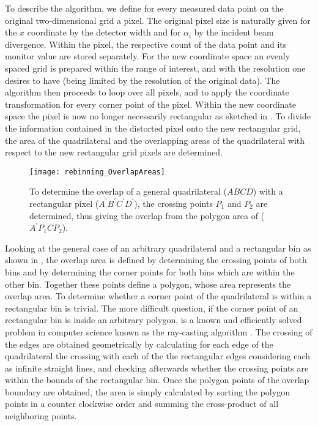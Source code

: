\documentclass[\main/dresen_thesis.tex]{subfiles}
\begin{document}
  To describe the algorithm, we define for every measured data point on the original two-dimensional grid a pixel.
  The original pixel size is naturally given for the $x$ coordinate by the detector width and for $\alpha_i$ by the incident beam divergence.
  Within the pixel, the respective count of the data point and its monitor value are stored separately.
  For the new coordinate space an evenly spaced grid is prepared within the range of interest, and with the resolution one desires to have (being limited by the resolution of the original data).
  The algorithm then proceeds to loop over all pixels, and to apply the coordinate transformation for every corner point of the pixel.
  Within the new coordinate space the pixel is now no longer necessarily rectangular as sketched in .
  To divide the information contained in the distorted pixel onto the new rectangular grid, the area of the quadrilateral and the overlapping areas of the quadrilateral with respect to the new rectangular grid pixels are determined.

  \begin{figure}[tb]
    \centering
    \texttt{[image: rebinning\_OverlapAreas]}
    \caption{\label{fig:numericalMethods:rebinningPixelSplitting:overlapAreas}To determine the overlap of a general quadrilateral ($ABCD$) with a rectangular pixel ($A^\prime B^\prime C^\prime D^\prime $), the crossing points $P_1$ and $P_2$ are determined, thus giving the overlap from the polygon area of ($A^\prime P_1CP_2$).}
  \end{figure}

  Looking at the general case of an arbitrary quadrilateral and a rectangular bin as shown in , the overlap area is defined by determining the crossing points of both bins and by determining the corner points for both bins which are within the other bin.
  Together these points define a polygon, whose area represents the overlap area.
  To determine whether a corner point of the quadrilateral is within a rectangular bin is trivial.
  The more difficult question, if the corner point of an rectangular bin is inside an arbitrary polygon, is a known and efficiently solved problem in computer science known as the ray-casting algorithm \cite{Shimrat_1962_Algor}.
  The crossing of the edges are obtained geometrically by calculating for each edge of the quadrilateral the crossing with each of the the rectangular edges considering each as infinite straight lines, and checking afterwards whether the crossing points are within the bounds of the rectangular bin.
  Once the polygon points of the overlap boundary are obtained, the area is simply calculated by sorting the polygon points in a counter clockwise order and summing the cross-product of all neighboring points.
\end{document}
